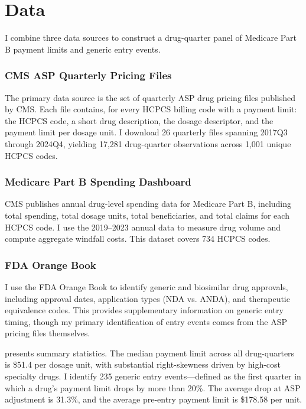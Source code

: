 \documentclass[12pt]{article}
\begin{document}
\section{Data}\label{sec:data}

I combine three data sources to construct a drug-quarter panel of Medicare Part B payment limits and generic entry events.

\subsubsection*{CMS ASP Quarterly Pricing Files} The primary data source is the set of quarterly ASP drug pricing files published by CMS. Each file contains, for every HCPCS billing code with a payment limit: the HCPCS code, a short drug description, the dosage descriptor, and the payment limit per dosage unit. I download 26 quarterly files spanning 2017Q3 through 2024Q4, yielding 17,281 drug-quarter observations across 1,001 unique HCPCS codes.

\subsubsection*{Medicare Part B Spending Dashboard} CMS publishes annual drug-level spending data for Medicare Part B, including total spending, total dosage units, total beneficiaries, and total claims for each HCPCS code. I use the 2019--2023 annual data to measure drug volume and compute aggregate windfall costs. This dataset covers 734 HCPCS codes.

\subsubsection*{FDA Orange Book} I use the FDA Orange Book to identify generic and biosimilar drug approvals, including approval dates, application types (NDA vs. ANDA), and therapeutic equivalence codes. This provides supplementary information on generic entry timing, though my primary identification of entry events comes from the ASP pricing files themselves.

 presents summary statistics. The median payment limit across all drug-quarters is \$51.4 per dosage unit, with substantial right-skewness driven by high-cost specialty drugs. I identify 235 generic entry events---defined as the first quarter in which a drug's payment limit drops by more than 20\%. The average drop at ASP adjustment is 31.3\%, and the average pre-entry payment limit is \$178.58 per unit.
\end{document}
